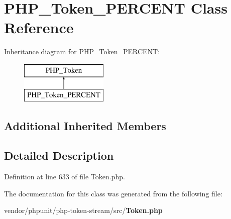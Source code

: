 \section{P\+H\+P\+\_\+\+Token\+\_\+\+P\+E\+R\+C\+E\+N\+T Class Reference}
\label{class_p_h_p___token___p_e_r_c_e_n_t}
Inheritance diagram for P\+H\+P\+\_\+\+Token\+\_\+\+P\+E\+R\+C\+E\+N\+T\+:\begin{figure}[H]
\begin{center}
\leavevmode
\includegraphics[height=2.000000cm]{class_p_h_p___token___p_e_r_c_e_n_t}
\end{center}
\end{figure}
\subsection*{Additional Inherited Members}


\subsection{Detailed Description}


Definition at line 633 of file Token.\+php.



The documentation for this class was generated from the following file\+:\begin{DoxyCompactItemize}
\item 
vendor/phpunit/php-\/token-\/stream/src/{\bf Token.\+php}\end{DoxyCompactItemize}
